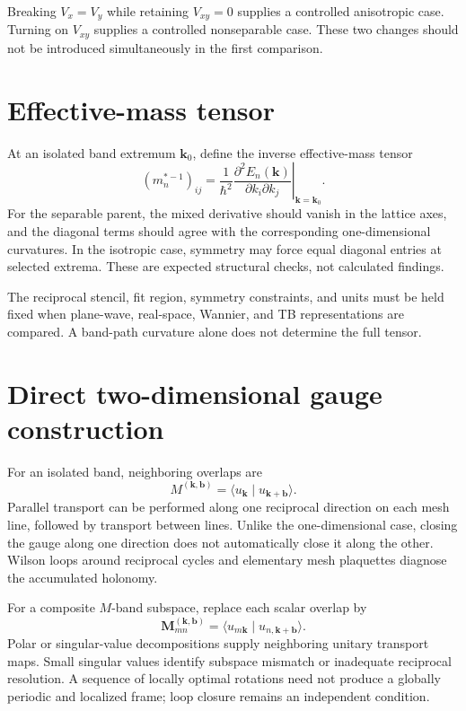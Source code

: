Breaking $V_x=V_y$ while retaining $V_{xy}=0$ supplies a controlled anisotropic
case. Turning on $V_{xy}$ supplies a controlled nonseparable case. These two
changes should not be introduced simultaneously in the first comparison.

\section*{Effective-mass tensor}

At an isolated band extremum $\mathbf k_0$, define the inverse effective-mass
tensor
\begin{equation}
    \left(m_n^{\ast-1}\right)_{ij}
    =
    \frac{1}{\hbar^2}
    \left.
        \frac{\partial^2E_n(\mathbf k)}
        {\partial k_i\partial k_j}
    \right|_{\mathbf k=\mathbf k_0}.
\end{equation}
For the separable parent, the mixed derivative should vanish in the lattice
axes, and the diagonal terms should agree with the corresponding
one-dimensional curvatures. In the isotropic case, symmetry may force equal
diagonal entries at selected extrema. These are expected structural checks,
not calculated findings.

The reciprocal stencil, fit region, symmetry constraints, and units must be
held fixed when plane-wave, real-space, Wannier, and TB representations are
compared. A band-path curvature alone does not determine the full tensor.

\section*{Direct two-dimensional gauge construction}

For an isolated band, neighboring overlaps are
\begin{equation}
    M^{(\mathbf k,\mathbf b)}
    =
    \langle
        u_{\mathbf k}
        \mid
        u_{\mathbf k+\mathbf b}
    \rangle.
\end{equation}
Parallel transport can be performed along one reciprocal direction on each
mesh line, followed by transport between lines. Unlike the one-dimensional
case, closing the gauge along one direction does not automatically close it
along the other. Wilson loops around reciprocal cycles and elementary mesh
plaquettes diagnose the accumulated holonomy.

For a composite $M$-band subspace, replace each scalar overlap by
\begin{equation}
    \mathbf M^{(\mathbf k,\mathbf b)}_{mn}
    =
    \langle
        u_{m\mathbf k}
        \mid
        u_{n,\mathbf k+\mathbf b}
    \rangle.
\end{equation}
Polar or singular-value decompositions supply neighboring unitary transport
maps. Small singular values identify subspace mismatch or inadequate reciprocal
resolution. A sequence of locally optimal rotations need not produce a globally
periodic and localized frame; loop closure remains an independent condition.

